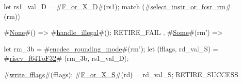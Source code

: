 let rs1_val_D = #\hyperref[sailRISCVzFzyorzyXzyD]{F\_or\_X\_D}#(rs1);
match (#\hyperref[sailRISCVzselectzyinstrzyorzyfcsrzyrm]{select\_instr\_or\_fcsr\_rm}# (rm)) {
  #\hyperref[sailRISCVzNone]{None}#() => { #\hyperref[sailRISCVzhandlezyillegal]{handle\_illegal}#(); RETIRE_FAIL },
  #\hyperref[sailRISCVzSome]{Some}#(rm') => {
    let rm_3b = #\hyperref[sailRISCVzencdeczyroundingzymode]{encdec\_rounding\_mode}#(rm');
    let (fflags, rd_val_S) = #\hyperref[sailRISCVzriscvzyf64ToF32]{riscv\_f64ToF32}# (rm_3b, rs1_val_D);

    #\hyperref[sailRISCVzwritezyfflags]{write\_fflags}#(fflags);
    #\hyperref[sailRISCVzFzyorzyXzyS]{F\_or\_X\_S}#(rd) = rd_val_S;
    RETIRE_SUCCESS
  }
}
